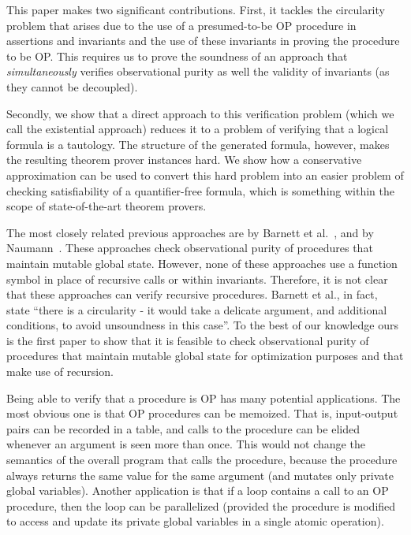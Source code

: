 
This paper makes two significant contributions. First, it tackles the
circularity problem that arises due to the use of a presumed-to-be OP
procedure in assertions and invariants and the use of these invariants in
proving the procedure to be OP. This requires us to prove the soundness of
an approach that \emph{simultaneously} verifies observational purity as well the validity of
invariants (as they cannot be decoupled).

Secondly, we show that a direct approach to this verification problem (which we
call the existential approach) reduces it to a problem of verifying that a logical formula
is a tautology. The structure of the generated formula, however, makes the resulting
theorem prover instances hard. We show how a conservative approximation can be
used to convert this hard problem into an easier problem of checking satisfiability
of a quantifier-free formula, which is something within the scope of state-of-the-art theorem
provers.


The most closely related previous approaches are by Barnett et
al.~\cite{barnett200499,barnett2006allowing}, and by
Naumann~\cite{naumann2007observational}.  These approaches check observational
purity of procedures that maintain mutable global state. However, none of
these approaches use a function symbol in place of recursive calls or
within invariants. Therefore, it is not clear that these approaches can
verify recursive procedures. 
Barnett et al., in fact, state ``there is a circularity - it would take a delicate argument, and additional conditions,
to avoid unsoundness in this case''.
To the best of our knowledge ours is the first paper to show that it is
feasible to check observational purity of procedures that maintain mutable
global state for optimization purposes and that make use of recursion.


Being able to verify that a procedure is OP has many potential
applications. The most obvious one is that OP procedures can be
memoized. That is, input-output pairs can be recorded in a table, and calls
to the procedure can be elided whenever an argument is seen more than
once. This would not change the semantics of the overall program that calls
the procedure, because the procedure always returns the same value for the
same argument (and mutates only private global variables). Another
application is that if a loop contains a call to an OP procedure, then the
loop can be parallelized (provided the procedure is modified to access and
update its private global variables in a single atomic operation).

